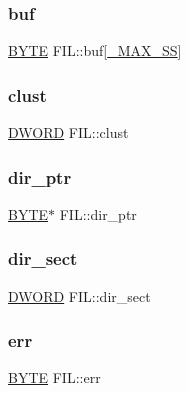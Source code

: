 \subsubsection{\texorpdfstring{buf}{buf}}
{\footnotesize\ttfamily \mbox{\hyperlink{lz4_8c_a4ae1dab0fb4b072a66584546209e7d58}{B\+Y\+TE}} F\+I\+L\+::buf\mbox{[}\mbox{\hyperlink{ffconf_8h_ac271b697378912f17132cb9c7d0de024}{\+\_\+\+M\+A\+X\+\_\+\+SS}}\mbox{]}}

\mbox{\label{struct_f_i_l_aa41312aba551b9a6d1c9d3c8c7d2734b}} 
\subsubsection{\texorpdfstring{clust}{clust}}
{\footnotesize\ttfamily \mbox{\hyperlink{integer_8h_ad342ac907eb044443153a22f964bf0af}{D\+W\+O\+RD}} F\+I\+L\+::clust}

\mbox{\label{struct_f_i_l_a5af9e9fb312b629220eaf684dd28c4a9}} 
\subsubsection{\texorpdfstring{dir\+\_\+ptr}{dir\_ptr}}
{\footnotesize\ttfamily \mbox{\hyperlink{lz4_8c_a4ae1dab0fb4b072a66584546209e7d58}{B\+Y\+TE}}$\ast$ F\+I\+L\+::dir\+\_\+ptr}

\mbox{\label{struct_f_i_l_ab203794f939ad4480e81dfa488770783}} 
\subsubsection{\texorpdfstring{dir\+\_\+sect}{dir\_sect}}
{\footnotesize\ttfamily \mbox{\hyperlink{integer_8h_ad342ac907eb044443153a22f964bf0af}{D\+W\+O\+RD}} F\+I\+L\+::dir\+\_\+sect}

\mbox{\label{struct_f_i_l_aea440945db26de9c4a88065c0c887fda}} 
\subsubsection{\texorpdfstring{err}{err}}
{\footnotesize\ttfamily \mbox{\hyperlink{lz4_8c_a4ae1dab0fb4b072a66584546209e7d58}{B\+Y\+TE}} F\+I\+L\+::err}

